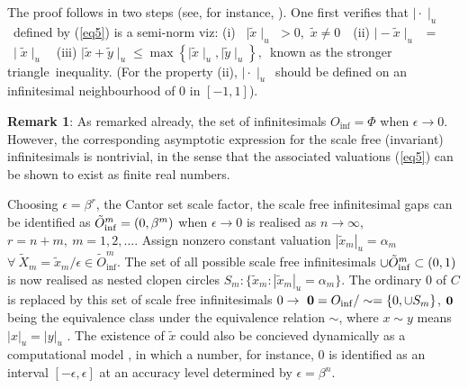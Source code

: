 \documentclass[12pt]{article}
\newtheorem{remark}[theorem]{Remark}
\begin{document}
The proof follows in two steps (see, for instance, \cite{ad}). One first verifies that $\mid
\cdot \mid _{u}$\ defined by (\ref{eq5}) is a semi-norm viz: (i) \ $\mid \tilde{x}
\mid_u $ $>0, $ $\tilde{x}\neq 0$\ \ (ii) $\mid -\tilde{x}\mid_u $\ $=$ $\ \mid 
\tilde{x}\mid_u $\ \ (iii) $\mid \tilde{x}+\tilde{y}\mid _{u}\leq \max
\left\{ \mid \tilde{x}\mid _{u},\mid \tilde{y}\mid _{u}\right\} ,$\ known as
the stronger triangle\ inequality. (For the property (ii), $\mid \cdot \mid
_{u}$\ should be defined on an infinitesimal neighbourhood of 0 in $[-1,1]$).

{\bf Remark 1}: 
As remarked already, the set of infinitesimals $O_{\inf} =\Phi$ when $\epsilon\rightarrow 0$. However, the corresponding asymptotic expression for the scale free (invariant) infinitesimals  is  nontrivial, in the sense that the associated valuations (\ref{eq5}) can be shown to exist as finite real numbers. 

Choosing $\epsilon=\beta^r$, the Cantor set scale factor,  the scale free infinitesimal gaps can be identified as $\tilde O^m_{\rm inf}= (0, \beta^m)$ when $\epsilon\rightarrow 0$ is realised as $n\rightarrow \infty$, $r=n+m, \ m=1,2,\ldots$. Assign nonzero constant valuation $|\tilde x_m|_u=\alpha_m$ $\forall\ \tilde X_m= \tilde x_m/\epsilon\in \tilde O^m _{\inf}$. The set of all possible scale free infinitesimals $\cup\tilde O^m_{\rm inf}\subset (0,1)$ is now realised as nested clopen circles $S_m: \{\tilde x_m:|\tilde x_m|_u=\alpha_m\}$.  The ordinary 0 of $C$ is  replaced by this set of scale free infinitesimals $0\rightarrow \ {\bf 0} =O_{\inf}/\sim = \{0, \cup S_m\}$, $\bf 0$ being the equivalence class under the equivalence relation $\sim$, where $x \sim y$ means $|x|_u=|y|_u$ . The existence of $\tilde x$ could also be concieved dynamically as a computational model \cite{sd1,sd2,ad}, in which a number, for instance, 0 is identified as an interval $[-\epsilon, \epsilon]$ at an accuracy level determined by  $\epsilon=\beta^n$. 
\end{document}
